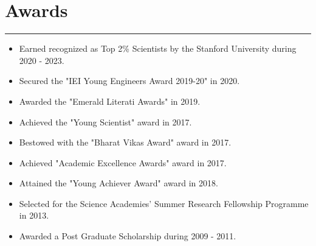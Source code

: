 \documentclass[10pt]{article}
\begin{document}
\section*{Awards}
\vspace*{-2.5mm}
\hrule 
\vspace*{2mm}
\begin{itemize}[leftmargin=*]
	\item Earned recognized as Top 2\% Scientists by the Stanford University during 2020 - 2023.
	\vspace*{-2mm}
	\item Secured the "IEI Young Engineers Award 2019-20" in 2020.
	\vspace*{-2mm}		
	\item Awarded the "Emerald Literati Awards" in 2019.
	\vspace*{-2mm}	
	\item Achieved the "Young Scientist" award in 2017.
	\vspace*{-2mm}	
	\item Bestowed with the "Bharat Vikas Award" award in 2017.
	\vspace*{-2mm}	
	\item Achieved "Academic Excellence Awards" award in 2017.
	\vspace*{-2mm}	
	\item Attained the "Young Achiever Award" award in 2018.
	
	\vspace*{-2mm}	
	\item Selected for the Science Academies’ Summer Research Fellowship Programme in 2013.	
	\vspace*{-2mm}	
	\item  Awarded a Post Graduate Scholarship during 2009 - 2011.	
	
\end{itemize}

	
\end{document}
